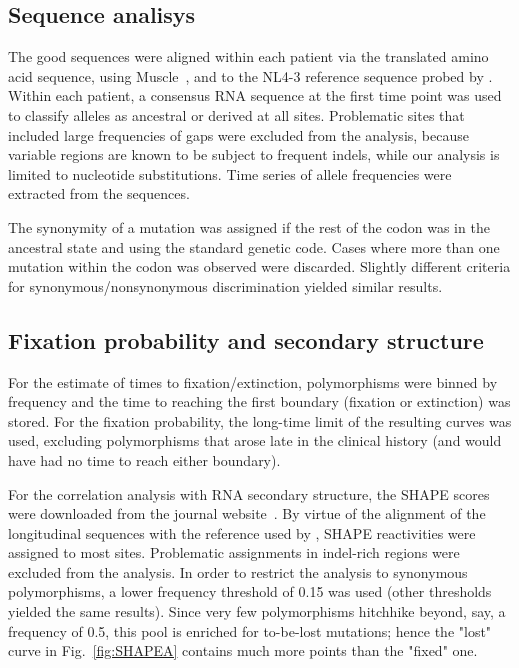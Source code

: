 \documentclass[rmp, twocolumn]{revtex4}
\newcommand{\FIG}[1]{Fig.~\ref{fig:#1}}
\begin{document}
\subsection{Sequence analisys}
The good sequences were aligned within each patient
via the translated amino acid sequence, using
Muscle~\citep{edgar_muscle:_2004}, and to the NL4-3 reference sequence probed
by \citet{watts_architecture_2009}. Within each patient, a consensus RNA
sequence at the first time point was used to classify alleles as ancestral or
derived at all sites. Problematic sites that included large frequencies of gaps
were excluded from the analysis, because variable regions are known to be
subject to frequent indels, while our analysis is limited to nucleotide
substitutions. Time series of allele frequencies were extracted from the
sequences.

The synonymity of a mutation was assigned if the rest of the codon was
in the ancestral state and using the standard genetic code. Cases where more
than one mutation within the codon was observed were discarded. Slightly
different criteria for synonymous/nonsynonymous discrimination yielded similar
results.

\subsection{Fixation probability and secondary structure}
For the estimate of times to fixation/extinction, polymorphisms were
binned by frequency and the time to reaching the first boundary (fixation or
extinction) was stored. For the fixation probability, the long-time limit of the
resulting curves was used, excluding polymorphisms that arose late in the
clinical history (and would have had no time to reach either boundary).

For the correlation analysis with RNA secondary structure, the SHAPE scores were
downloaded from the journal website~\citep{watts_architecture_2009}. By virtue
of the alignment of the longitudinal sequences with the reference used by
\citet{watts_architecture_2009}, SHAPE reactivities were assigned to most sites.
Problematic assignments in indel-rich regions were excluded from the analysis.
In order to restrict the analysis to synonymous polymorphisms, a lower frequency
threshold of 0.15 was used (other thresholds yielded the same results). Since
very few polymorphisms hitchhike beyond, say, a frequency of 0.5, this pool is
enriched for to-be-lost mutations; hence the "lost" curve in \FIG{SHAPEA}
contains much more points than the "fixed" one.
\end{document}
